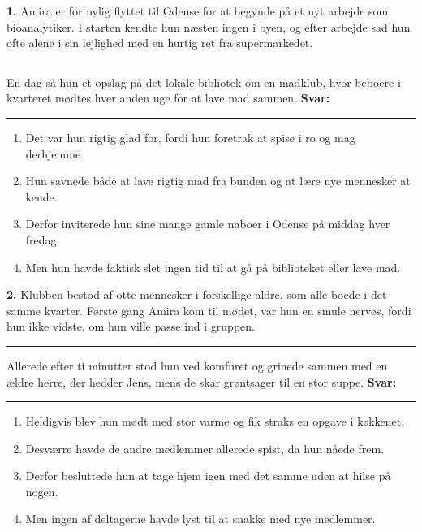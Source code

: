 \vspace{0.2em}
\textbf{1.} Amira er for nylig flyttet til Odense for at begynde på et nyt arbejde som bioanalytiker. I starten kendte hun næsten ingen i byen, og efter arbejde sad hun ofte alene i sin lejlighed med en hurtig ret fra supermarkedet. \rule{2.4cm}{0.4pt} En dag så hun et opslag på det lokale bibliotek om en madklub, hvor beboere i kvarteret mødtes hver anden uge for at lave mad sammen. \quad \textbf{Svar:} \rule{1.0cm}{0.4pt}
\begin{enumerate}[label=\textbf{\Alph*.}, leftmargin=2.2em, itemsep=0.12em]
  \item Det var hun rigtig glad for, fordi hun foretrak at spise i ro og mag derhjemme.
  \item Hun savnede både at lave rigtig mad fra bunden og at lære nye mennesker at kende.
  \item Derfor inviterede hun sine mange gamle naboer i Odense på middag hver fredag.
  \item Men hun havde faktisk slet ingen tid til at gå på biblioteket eller lave mad.
\end{enumerate}

\vspace{0.25em}
\textbf{2.} Klubben bestod af otte mennesker i forskellige aldre, som alle boede i det samme kvarter. Første gang Amira kom til mødet, var hun en smule nervøs, fordi hun ikke vidste, om hun ville passe ind i gruppen. \rule{2.4cm}{0.4pt} Allerede efter ti minutter stod hun ved komfuret og grinede sammen med en ældre herre, der hedder Jens, mens de skar grøntsager til en stor suppe. \quad \textbf{Svar:} \rule{1.0cm}{0.4pt}
\begin{enumerate}[label=\textbf{\Alph*.}, leftmargin=2.2em, itemsep=0.12em]
  \item Heldigvis blev hun mødt med stor varme og fik straks en opgave i køkkenet.
  \item Desværre havde de andre medlemmer allerede spist, da hun nåede frem.
  \item Derfor besluttede hun at tage hjem igen med det samme uden at hilse på nogen.
  \item Men ingen af deltagerne havde lyst til at snakke med nye medlemmer.
\end{enumerate}

